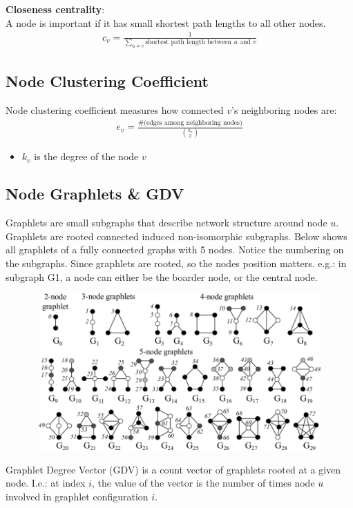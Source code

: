 \textbf{Closeness centrality}:\\
A node is important if it has small shortest path lengths to all other nodes. 
    \begin{align*}
        c_v = \frac{1}{\sum_{u\neq v}\textrm{shortest path length between $u$ and $v$}}
    \end{align*}


\subsection{Node Clustering Coefficient}
Node clustering coefficient measures how connected $v$'s neighboring nodes are: 
    \begin{align*}
        e_v = \frac{\textrm{\#(edges among neighboring nodes)}}{{k_v \choose 2}}
    \end{align*}
    \begin{itemize}
        \item $k_v$ is the degree of the node $v$
    \end{itemize}

\subsection{Node Graphlets \& GDV}
Graphlets are small subgraphs that describe network structure around node $u$. Graphlets are rooted connected induced non-isomorphic subgraphs. Below shows all graphlets of a fully connected graphs with 5 nodes. Notice the numbering on the subgraphs. Since graphlets are rooted, so the nodes position matters. e.g.: in subgraph G1, a node can either be the boarder node, or the central node. \\
\begin{figure}[H]
\includegraphics[width=12cm, height=6cm]{images/001_graphlets.png}
\end{figure}
Graphlet Degree Vector (GDV) is a count vector of graphlets rooted at a given node. I.e.: at index $i$, the value of the vector is the number of times node $u$ involved in graphlet configuration $i$. 




